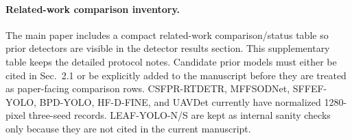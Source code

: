 \paragraph{Related-work comparison inventory.}
The main paper includes a compact related-work comparison/status table so prior
detectors are visible in the detector results section. This supplementary table
keeps the detailed protocol notes. Candidate prior models must either be cited
in Sec.~2.1 or be explicitly added to the manuscript before they are treated as
paper-facing comparison rows. CSFPR-RTDETR, MFFSODNet, SFFEF-YOLO, BPD-YOLO,
HF-D-FINE, and UAVDet currently have normalized 1280-pixel three-seed records.
LEAF-YOLO-N/S are kept as internal sanity checks only because they are not cited
in the current manuscript.

\begin{table}[!htbp]
\centering
\scriptsize
\setlength{\tabcolsep}{3pt}
\caption{Measured cited related-work checks. Rows use VisDrone2019-DET
validation at 1280 input with seeds 42, 123, and 2026 unless otherwise noted.}
\label{tab:supp_related_work_eval_rows}
\end{table}


